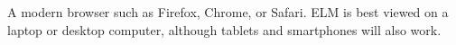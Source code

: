 A modern browser such as Firefox, Chrome, or Safari. ELM is best viewed
on a laptop or desktop computer, although tablets and smartphones will
also work.

